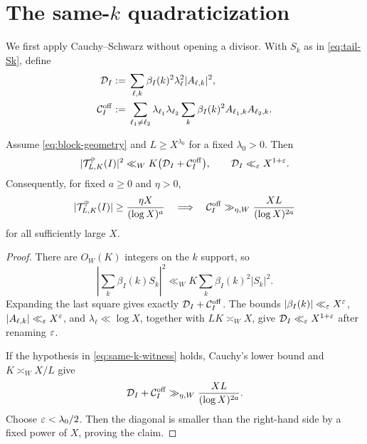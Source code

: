 \section{The same-\texorpdfstring{$k$}{k} quadraticization}
\label{sec:same-k}

We first apply Cauchy--Schwarz without opening a divisor.  With $S_k$
as in \eqref{eq:tail-Sk}, define
\begin{align}
 \mathcal D_I
 :={}&\sum_{\ell,k}\beta_I(k)^2\lambda_\ell^2
 |A_{\ell,k}|^2,
 \label{eq:same-k-diagonal}\\
 \mathcal C_I^{\mathrm{off}}
 :={}&\sum_{\ell_1\ne\ell_2}
 \lambda_{\ell_1}\lambda_{\ell_2}
 \sum_k\beta_I(k)^2
 A_{\ell_1,k}A_{\ell_2,k}.
 \label{eq:same-k-off}
\end{align}

\begin{theorem}
\label{thm:same-k-ttstar}
Assume \eqref{eq:block-geometry} and $L\ge X^{\lambda_0}$ for a fixed
$\lambda_0>0$.  Then
\begin{equation}
 |\mathcal T^{\mathbb P}_{L,K}(I)|^2
 \ll_W K\bigl(\mathcal D_I+\mathcal C_I^{\mathrm{off}}\bigr),
 \qquad
 \mathcal D_I\ll_{\varepsilon}X^{1+\varepsilon}.
 \label{eq:same-k-TTstar}
\end{equation}
Consequently, for fixed $a\ge0$ and $\eta>0$,
\begin{equation}
 |\mathcal T^{\mathbb P}_{L,K}(I)|
 \ge\frac{\eta X}{(\log X)^a}
 \quad\Longrightarrow\quad
 \mathcal C_I^{\mathrm{off}}
 \gg_{\eta,W}\frac{XL}{(\log X)^{2a}}
 \label{eq:same-k-witness}
\end{equation}
for all sufficiently large $X$.
\end{theorem}

\begin{proof}
There are $O_W(K)$ integers on the $k$ support, so
\[
 \left|\sum_k\beta_I(k)S_k\right|^2
 \ll_WK\sum_k\beta_I(k)^2|S_k|^2.
\]
Expanding the last square gives exactly
$\mathcal D_I+\mathcal C_I^{\mathrm{off}}$.  The bounds
$|\beta_I(k)|\ll_\varepsilon X^\varepsilon$,
$|A_{\ell,k}|\ll_\varepsilon X^\varepsilon$, and
$\lambda_\ell\ll\log X$, together with $LK\asymp_WX$, give
$\mathcal D_I\ll_\varepsilon X^{1+\varepsilon}$ after renaming $\varepsilon$.

If the hypothesis in \eqref{eq:same-k-witness} holds, Cauchy's lower
bound and $K\asymp_WX/L$ give
\[
 \mathcal D_I+\mathcal C_I^{\mathrm{off}}
 \gg_{\eta,W}\frac{XL}{(\log X)^{2a}}.
\]
Choose $\varepsilon<\lambda_0/2$.  Then the diagonal is smaller than the
right-hand side by a fixed power of $X$, proving the claim.
\end{proof}

